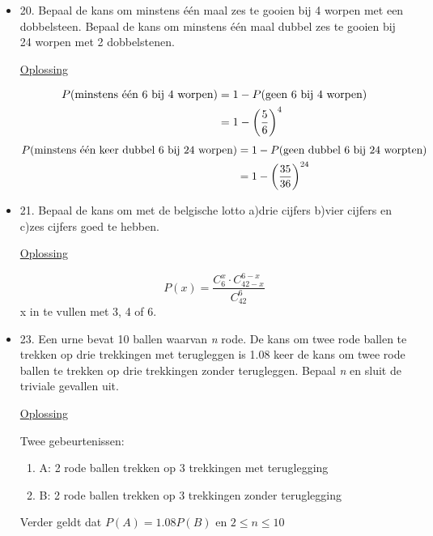 \documentclass[12pt]{report}
\newcommand{\exercise}[2]{
  #1
  

  \underline{Oplossing}
  
  #2
  
    \hrulefill
}
\begin{document}
\begin{itemize}[label={}, leftmargin=*]
{\begin{enumerate}
	      \end{enumerate} }
	  
	\item{\exercise{20. Bepaal de kans om minstens één maal zes te gooien bij 4 worpen met een dobbelsteen. Bepaal de kans om minstens één maal dubbel zes te gooien bij 24 worpen met 2 dobbelstenen.}{
	        
	      \begin{equation*}
	      	\begin{split}
	      		P(\hbox{minstens één 6 bij 4 worpen}) & = 1 - P(\hbox{geen 6 bij 4 worpen})\\
	      		& = 1 - \bigg(\frac{5}{6}\bigg)^4
	      	\end{split}
	      \end{equation*}
	      \begin{equation*}
	      	\begin{split}
	      		P(\hbox{minstens één keer dubbel 6 bij 24 worpen}) & = 1 - P(\hbox{geen dubbel 6 bij 24 worpten})\\
	      		& = 1 - \bigg(\frac{35}{36}\bigg)^{24}
	      	\end{split}
	      \end{equation*}
	        
	}}
	  
	\item{\exercise{21. Bepaal de kans om met de belgische lotto a)drie cijfers b)vier cijfers en c)zes cijfers goed te hebben.}{  $$P(x) = \frac{C_6^x \cdot C_{42 - x}^{6 - x}}{C_{42}^{6}}$$
	x in te vullen met 3, 4 of 6.}}
	
	\item {\exercise{23. Een urne bevat 10 ballen waarvan \textit{n} rode. De kans om twee rode ballen te trekken op drie trekkingen met terugleggen is 1.08 keer de kans om twee rode ballen te trekken op drie trekkingen zonder terugleggen. Bepaal \textit{n} en sluit de triviale gevallen uit.}{
	Twee gebeurtenissen:
	\begin{enumerate}
	 \item A: 2 rode ballen trekken op 3 trekkingen met teruglegging
	 \item B: 2 rode ballen trekken op 3 trekkingen zonder teruglegging
	\end{enumerate}
	Verder geldt dat $P(A) = 1.08P(B)$ en $2 \leq n \leq 10$
	
}}
\end{itemize}
\end{document}
